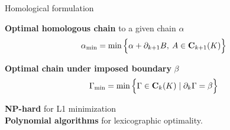 \begin{frame}{Homological formulation}
\scriptsize

\begin{minipage}[c]{0.55\linewidth}
\textbf{Optimal homologous chain} to a given chain $\alpha$
\begin{equation*}
	\alpha_{\min} = \min \Big\{ \alpha + \partial_{k+1} B, \: A \in \mathbf{C}_{k+1}(K) \Big\}
\end{equation*}

\textbf{Optimal chain under imposed boundary} $\beta$
\begin{equation*}
	\Gamma_{\min} = \min \Big\{ \Gamma \in \mathbf{C}_k(K) \mid \partial_k \Gamma = \beta \Big\}
\end{equation*}
\end{minipage}%
\hfill%
\begin{minipage}[c]{0.40\linewidth}
\end{minipage}

\pause
\vspace{1cm}
\textbf{NP-hard} for L1 minimization \cite{chen_HardnessResultsHomology_2011} \\
\pause
\textbf{Polynomial algorithms} for lexicographic optimality.
\end{frame}

